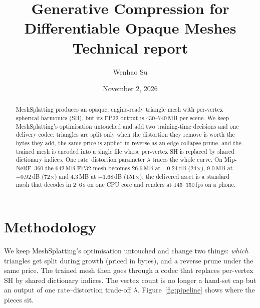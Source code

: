 \documentclass[11pt,a4paper]{article}
\title{Generative Compression for Differentiable Opaque Meshes\\[2pt]
\large Technical report}
\author{Wenhao Su}
\date{November 2, 2026}
\begin{document}
\maketitle

\begin{abstract}
MeshSplatting produces an opaque, engine-ready triangle mesh with per-vertex spherical harmonics (SH), but its FP32 output is 430--740\,MB per scene. We keep MeshSplatting's optimisation untouched and add two training-time decisions and one delivery codec: triangles are split only when the distortion they remove is worth the bytes they add, the same price is applied in reverse as an edge-collapse prune, and the trained mesh is encoded into a single file whose per-vertex SH is replaced by shared dictionary indices. One rate--distortion parameter $\lambda$ traces the whole curve. On Mip-NeRF~360 the 642\,MB FP32 mesh becomes 26.6\,MB at $-0.24$\,dB (24$\times$), 9.0\,MB at $-0.92$\,dB (72$\times$) and 4.3\,MB at $-1.68$\,dB (151$\times$); the delivered asset is a standard mesh that decodes in 2--6\,s on one CPU core and renders at 145--350\,fps on a phone.
\end{abstract}

\section{Methodology}
\label{sec:method}

We keep MeshSplatting's optimisation untouched and change two things: \emph{which} triangles get split during growth (priced in bytes), and a reverse prune under the same price. The trained mesh then goes through a codec that replaces per-vertex SH by shared dictionary indices. The vertex count is no longer a hand-set cap but an output of one rate--distortion trade-off $\lambda$. Figure~\ref{fig:pipeline} shows where the pieces sit.
\end{document}
